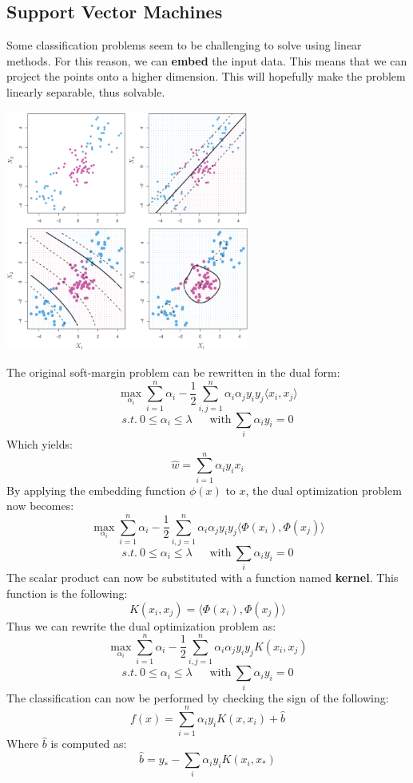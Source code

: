\documentclass{article}
\begin{document}
\subsection{Support Vector Machines}
Some classification problems seem to be challenging to solve using linear methods. For this reason, we can \textbf{embed} the input data. This means that we can project the points onto a higher dimension. This will hopefully make the problem linearly separable, thus solvable.

\begin{center}
	\includegraphics[width=8cm]{assets/svm.png}
\end{center}
The original soft-margin problem can be rewritten in the dual form:
\[ \max_{\alpha_i} \sum^n_{i=1} \alpha_i - \frac{1}{2} \sum^n_{i, j = 1} \alpha_i \alpha_j y_i y_j \langle x_i, x_j\rangle \]
\[ s.t. ~ 0 \leq \alpha_i \leq \lambda ~~~~~~~ \text{with} ~ \displaystyle \sum_i \alpha_i y_i = 0 \]
Which yields:
\[ \hat w = \displaystyle\sum^n_{i = 1} \alpha_i y_i x_i \]
By applying the embedding function $\phi(x)$ to $x$, the dual optimization problem now becomes:
\[ \displaystyle \max_{\alpha_i} \sum^n_{i=1} \alpha_i - \frac{1}{2} \sum^n_{i, j = 1} \alpha_i \alpha_j y_i y_j \langle \Phi(x_i), \Phi(x_j)\rangle \]
\[ s.t. ~ 0 \leq \alpha_i \leq \lambda ~~~~~~~ \text{with} ~ \displaystyle \sum_i \alpha_i y_i = 0 \]
The scalar product can now be substituted with a function named \textbf{kernel}. This function is the following:
\[ K(x_i, x_j) = \langle \Phi(x_i), \Phi(x_j) \rangle \]
Thus we can rewrite the dual optimization problem as:
\[ \displaystyle \max_{\alpha_i} \sum^n_{i=1} \alpha_i - \frac{1}{2} \sum^n_{i, j = 1} \alpha_i \alpha_j y_i y_j K(x_i, x_j) \]
\[ s.t. ~ 0 \leq \alpha_i \leq \lambda ~~~~~~~ \text{with} ~ \displaystyle \sum_i \alpha_i y_i = 0 \]
The classification can now be performed by checking the sign of the following:
\[ f(x) = \sum^n_{i = 1} \alpha_i y_i K(x, x_i) + \hat b \]
Where $\hat b$ is computed as:
\[ \hat b = y_* - \sum_i \alpha_i y_i K(x_i, x_*) \]
\end{document}
